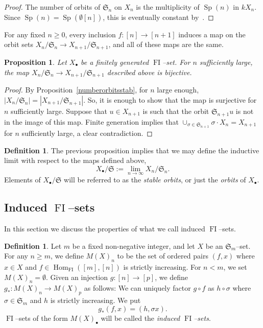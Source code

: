 \documentclass[10pt]{amsart}
\DeclareMathOperator{\FI}{FI}
\DeclareMathOperator{\Hom}{Hom}
\DeclareMathOperator{\Sp}{Sp}
\newcommand{\Sn}{\mathfrak{S}}
\newcommand{\dt}{\bullet}
\newtheorem{prop}[theorem]{Proposition}
\theoremstyle{definition}
\newtheorem{definition}[theorem]{Definition}
\begin{document}
\begin{proof}
The number of orbits of $\Sn_n$ on $X_n$ is the multiplicity of $\Sp(n)$ in $k X_n$. Since $\Sp(n) = \Sp(\emptyset[n])$, this is eventually constant by~\cite[Theorem~1.13]{CEF}.
\end{proof}

For any fixed $n \geq 0$, every inclusion $f: [n] \to [n+1]$ induces a map on the orbit sets $X_n/\Sn_n \to X_{n+1}/\Sn_{n+1}$, and all of these maps are the same.

\begin{prop} \label{EventuallyBijective}
Let $X_\dt$ be a finitely generated $\FI$--set. For $n$ sufficiently large, the map $X_n/\Sn_n \to X_{n+1}/\Sn_{n+1}$ described above is bijective.
\end{prop}

\begin{proof}
By Proposition~\ref{numberorbitsstab}, for $n$ large enough, $|X_n/\Sn_n| = |X_{n+1}/\Sn_{n+1}|$. So, it is enough to show that the map is surjective for $n$ sufficiently large. Suppose that $u \in X_{n+1}$ is such that the orbit $\Sn_{n+1} u$ is not in the image of this map. Finite generation implies that $\cup_{\sigma \in \Sn_{n+1}} \sigma \cdot X_n=X_{n+1}$ for $n$ sufficiently large, a clear contradiction.
\end{proof}


\begin{definition}
The previous proposition implies that we may define the inductive limit with respect to the maps defined above,
\[
X_{\dt}/\Sn := \lim_{n \to \infty} X_n/\Sn_n.
\]
Elements of $X_{\dt}/\Sn$ will be referred to as the \emph{stable orbits}, or just the \emph{orbits} of $X_\dt$.
\end{definition}

\subsection{Induced \texorpdfstring{$\FI$}{FI}--sets}

In this section we discuss the properties of what we call induced $\FI$--sets.


\begin{definition}\label{inducedset}
Let $m$ be a fixed non-negative integer, and let $X$ be an $\Sn_m$--set. 
For any $n \geq m$, we define $M(X)_n$ to be the set of ordered pairs $(f,x)$
where $x \in X$ and $f \in \Hom_{\FI}([m],[n])$ is strictly increasing. For $n < m$, we set $M(X)_n = \emptyset$.
Given an injection $g:[n] \to [p]$, we define $g_{\ast} : M(X)_n \to M(X)_p$ as follows: 
We can uniquely factor $g \circ f$ as $h \circ \sigma$ where $\sigma \in \Sn_m$ and $h$ is strictly increasing. We put
\[ 
g_{\ast}(f,x) = (h,\sigma x) .
\]
$\FI$--sets of the form $M(X)_\dt$ will be called the \emph{induced $\FI$--sets}.
\end{definition}
\end{document}
